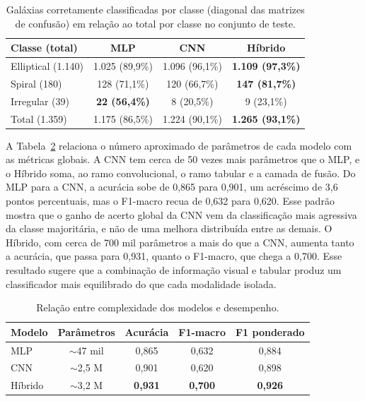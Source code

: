 \documentclass[12pt, a4paper]{article}
\begin{document}
\begin{table}[H]
  \centering
  \caption{Galáxias corretamente classificadas por classe (diagonal das
           matrizes de confusão) em relação ao total por classe no
           conjunto de teste.}
  \label{tab:diagonal_cm}
  \begin{tabular}{lccc}
    \toprule
    \textbf{Classe (total)} & \textbf{MLP} & \textbf{CNN} & \textbf{Híbrido} \\
    \midrule
    Elliptical (1.140) & 1.025 (89,9\%) & 1.096 (96,1\%) & \textbf{1.109 (97,3\%)} \\
    Spiral (180)       & 128 (71,1\%)   & 120 (66,7\%)   & \textbf{147 (81,7\%)}   \\
    Irregular (39)     & \textbf{22 (56,4\%)} & 8 (20,5\%) & 9 (23,1\%)       \\
    \midrule
    Total (1.359)      & 1.175 (86,5\%) & 1.224 (90,1\%) & \textbf{1.265 (93,1\%)} \\
    \bottomrule
  \end{tabular}
\end{table}

A Tabela~\ref{tab:complexidade} relaciona o número aproximado de
parâmetros de cada modelo com as métricas globais. A CNN tem cerca de
50 vezes mais parâmetros que o MLP, e o Híbrido soma, ao ramo
convolucional, o ramo tabular e a camada de fusão. Do MLP para a CNN,
a acurácia sobe de 0,865 para 0,901, um acréscimo de 3,6 pontos
percentuais, mas o F1-macro recua de 0,632 para 0,620. Esse padrão
mostra que o ganho de acerto global da CNN vem da classificação mais
agressiva da classe majoritária, e não de uma melhora distribuída
entre as demais. O Híbrido, com cerca de 700 mil parâmetros a mais do
que a CNN, aumenta tanto a acurácia, que passa para 0,931, quanto o
F1-macro, que chega a 0,700. Esse resultado sugere que a combinação
de informação visual e tabular produz um classificador mais
equilibrado do que cada modalidade isolada.

\begin{table}[H]
  \centering
  \caption{Relação entre complexidade dos modelos e desempenho.}
  \label{tab:complexidade}
  \begin{tabular}{lcccc}
    \toprule
    \textbf{Modelo} & \textbf{Parâmetros} & \textbf{Acurácia} & \textbf{F1-macro} & \textbf{F1 ponderado} \\
    \midrule
    MLP     & $\sim$47 mil  & 0,865          & 0,632          & 0,884          \\
    CNN     & $\sim$2,5 M   & 0,901          & 0,620          & 0,898          \\
    Híbrido & $\sim$3,2 M   & \textbf{0,931} & \textbf{0,700} & \textbf{0,926} \\
    \bottomrule
  \end{tabular}
\end{table}
\end{document}
